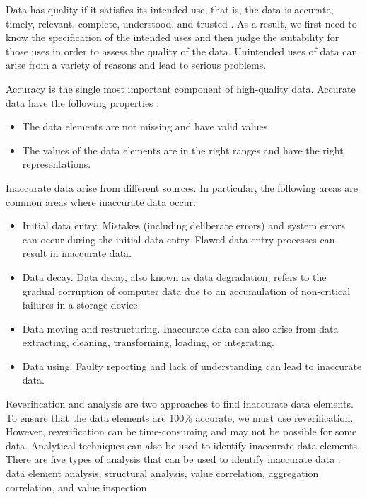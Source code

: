 \documentclass[]{book}
\providecommand{\tightlist}{%
  \setlength{\itemsep}{0pt}\setlength{\parskip}{0pt}}
\theoremstyle{definition}
\theoremstyle{definition}
\theoremstyle{definition}
\theoremstyle{remark}
\begin{document}
Data has quality if it satisfies its intended use, that is, the data is
accurate, timely, relevant, complete, understood, and trusted
\citep{olson2003}. As a result, we first need to know the specification
of the intended uses and then judge the suitability for those uses in
order to assess the quality of the data. Unintended uses of data can
arise from a variety of reasons and lead to serious problems.

Accuracy is the single most important component of high-quality data.
Accurate data have the following properties \citep{olson2003}:

\begin{itemize}
\tightlist
\item
  The data elements are not missing and have valid values.
\item
  The values of the data elements are in the right ranges and have the
  right representations.
\end{itemize}

Inaccurate data arise from different sources. In particular, the
following areas are common areas where inaccurate data occur:

\begin{itemize}
\tightlist
\item
  Initial data entry. Mistakes (including deliberate errors) and system
  errors can occur during the initial data entry. Flawed data entry
  processes can result in inaccurate data.
\item
  Data decay. Data decay, also known as data degradation, refers to the
  gradual corruption of computer data due to an accumulation of
  non-critical failures in a storage device.
\item
  Data moving and restructuring. Inaccurate data can also arise from
  data extracting, cleaning, transforming, loading, or integrating.
\item
  Data using. Faulty reporting and lack of understanding can lead to
  inaccurate data.
\end{itemize}

Reverification and analysis are two approaches to find inaccurate data
elements. To ensure that the data elements are 100\% accurate, we must
use reverification. However, reverification can be time-consuming and
may not be possible for some data. Analytical techniques can also be
used to identify inaccurate data elements. There are five types of
analysis that can be used to identify inaccurate data \citep{olson2003}:
data element analysis, structural analysis, value correlation,
aggregation correlation, and value inspection
\end{document}
